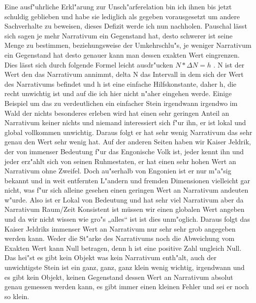 \documentclass[a5paper,8pt]{book}
\begin{document}
Eine ausf"uhrliche Erkl"arung zur Unsch"arferelation bin ich ihnen bis jetzt schuldig geblieben und habe sie lediglich als gegeben vorausgesetzt um 
andere Sachverhalte zu beweisen, dieses Defizit werde ich nun nachholen.
Pauschal lässt sich sagen je mehr Narrativum ein Gegenstand hat, desto schwerer ist seine Menge zu bestimmen, beziehungsweise der Umkehrschlu"s, je weniger 
Narrativum ein Gegenstand hat desto genauer kann man dessen exakten Wert eingrenzen. Dies lässt sich durch folgende Formel leicht ausdr"ucken  
$N * \Delta N = h$ . N  ist der Wert den das Narrativum annimmt,  delta N  das Intervall in dem sich der Wert des Narrativums befindet und h ist eine einfache 
Hilfskonstante, daher h, die recht unwichtig ist und auf die ich hier nicht n"aher eingehen werde. Einige Beispiel um das zu verdeutlichen ein einfacher 
Stein irgendwann irgendwo im Wald der nichts besonderes erleben wird hat einen sehr geringen Anteil an Narrativum keiner nichts und niemand interessiert 
sich f"ur ihn, er ist lokal und global vollkommen unwichtig. Daraus folgt er hat sehr wenig Narrativum das sehr genau den Wert sehr wenig hat. Auf 
der anderen Seiten haben wir Kaiser Jeldrik, der von immenser Bedeutung f"ur das Engonische Volk ist, jeder kennt ihn 
und jeder erz"ahlt sich von seinen Ruhmestaten, er hat einen sehr hohen Wert an Narrativum ohne Zweifel. Doch au"serhalb von Engonien ist er nur m"a"sig 
bekannt und in weit entfernten L"andern und fremden Dimensionen vielleicht gar nicht, was f"ur sich alleine gesehen einen geringen Wert an Narrativum andeuten 
w"urde. Also ist er Lokal von Bedeutung und hat sehr viel Narrativum aber da Narrativum Raum/Zeit Konsistent ist müssen wir einen globalen Wert angeben 
und da wir nicht wissen wie gro"s „alles“ ist ist dies unm"oglich. Daraus folgt das Kaiser Jeldriks immenser Wert an Narrativum nur sehr sehr grob 
angegeben werden kann.
Weder die St"arke des Narrativums noch die Abweichung vom Exakten Wert kann Null betragen, denn h ist eine positive Zahl ungleich Null. Das hei"st es 
gibt kein Objekt was kein Narrativum enth"alt, auch der unwichtigste Stein ist ein ganz, ganz, ganz klein wenig wichtig, irgendwann und es gibt kein Objekt, 
keinen Gegenstand dessen Wert an Narrativum absolut genau gemessen werden kann, es gibt immer einen kleinen Fehler und sei er noch so klein.

\newpage
\end{document}
